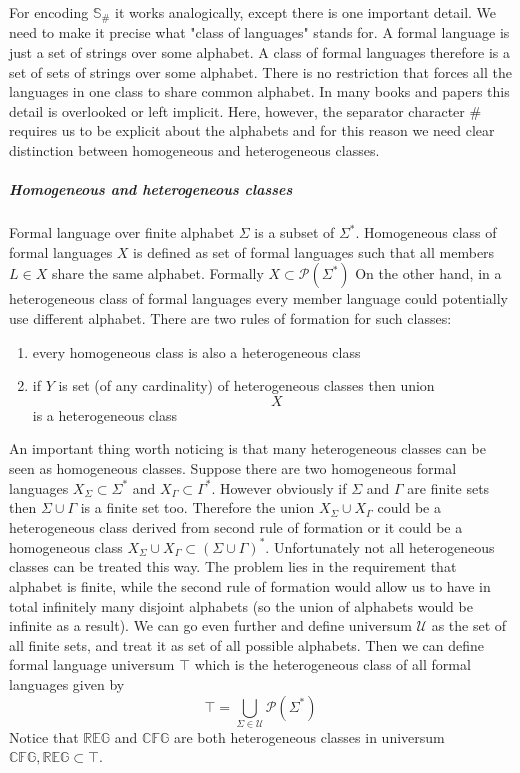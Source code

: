 \documentclass[12pt]{article}
\begin{document}
For encoding  $\mathbb{S}_\#$ it works analogically, except there is one important detail. We need to make it precise what "class of languages" stands for. A formal language is just a set of strings over some alphabet. A class of formal languages therefore is a set of sets of strings over some alphabet. There is no restriction that forces all the languages in one class to share common alphabet. In many books and papers this detail is overlooked or left implicit. Here, however, the separator character $\#$ requires us to be explicit about the alphabets and for this reason we need clear distinction between homogeneous and heterogeneous classes. 

 \subparagraph{Homogeneous and heterogeneous classes}  Formal language over finite alphabet $\Sigma$ is a subset of $\Sigma^*$. Homogeneous class of formal languages $X$ is defined as set of formal languages such that all members $L \in X$ share the same alphabet. Formally $X \subset\mathcal{P}(\Sigma^*)$ On the other hand, in a heterogeneous class of formal languages every member language could potentially use different alphabet. There are two rules of formation for such classes:
 \begin{enumerate}
	\item every homogeneous class is also a heterogeneous class
	\item if $Y$ is set (of any cardinality) of  heterogeneous classes then union	\[
	\mathop{\bigcup_{X\in Y}} X
	\] is a heterogeneous class
 \end{enumerate} 
An important thing worth noticing is that many heterogeneous classes can be seen as homogeneous classes. Suppose there are two homogeneous formal languages $X_\Sigma \subset \Sigma^*$ and  $X_\Gamma \subset \Gamma^*$. However obviously if $\Sigma$ and $\Gamma$ are finite sets then $\Sigma \cup \Gamma$ is a finite set too. Therefore the union $X_\Sigma \cup X_\Gamma$ could be a heterogeneous class derived from second rule of formation or it could be a  homogeneous class $X_\Sigma \cup X_\Gamma \subset (\Sigma \cup \Gamma)^*$. Unfortunately not all heterogeneous classes can be treated this way. The problem lies in the requirement that alphabet is finite, while the second rule of formation would allow us to have in total infinitely many disjoint alphabets (so the union of alphabets would be infinite as a result).  We can go even further and define universum $\mathcal{U}$ as the set of all finite sets, and treat it as set of all possible alphabets. Then we can define formal language universum $\top$ which is the heterogeneous class of all formal languages given by \[
\top = \bigcup_{\Sigma \in \mathcal{U}} \mathcal{P}(\Sigma^*) 
\]
Notice that $\mathbb{REG}$ and $\mathbb{CFG}$ are both heterogeneous classes in universum $\mathbb{CFG}, \mathbb{REG} \subset \top$. 
\end{document}
